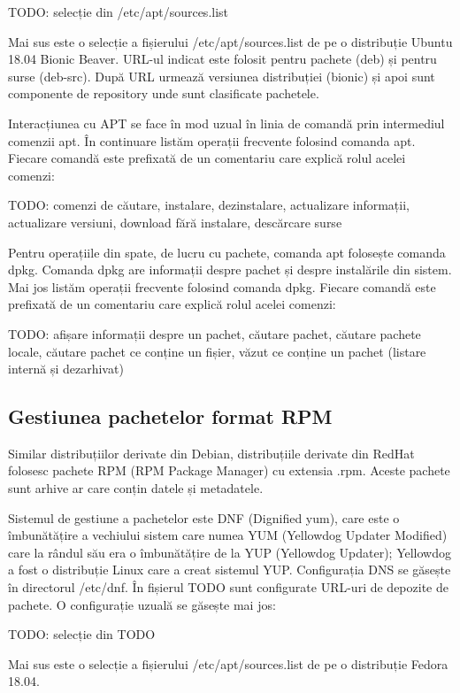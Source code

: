 TODO: selecție din /etc/apt/sources.list

Mai sus este o selecție a fișierului /etc/apt/sources.list de pe o distribuție Ubuntu 18.04 Bionic Beaver. URL-ul indicat este folosit pentru pachete (deb) și pentru surse (deb-src). După URL urmează versiunea distribuției (bionic) și apoi sunt componente de repository unde sunt clasificate pachetele.

Interacțiunea cu APT se face în mod uzual în linia de comandă prin intermediul comenzii apt. În continuare listăm operații frecvente folosind comanda apt. Fiecare comandă este prefixată de un comentariu care explică rolul acelei comenzi:

TODO: comenzi de căutare, instalare, dezinstalare, actualizare informații, actualizare versiuni, download fără instalare, descărcare surse

Pentru operațiile din spate, de lucru cu pachete, comanda apt folosește comanda dpkg. Comanda dpkg are informații despre pachet și despre instalările din sistem. Mai jos listăm operații frecvente folosind comanda dpkg. Fiecare comandă este prefixată de un comentariu care explică rolul acelei comenzi:

TODO: afișare informații despre un pachet, căutare pachet, căutare pachete locale, căutare pachet ce conține un fișier, văzut ce conține un pachet (listare internă și dezarhivat)

\subsection{Gestiunea pachetelor format RPM}
\label{sec:package:rpm}

Similar distribuțiilor derivate din Debian, distribuțiile derivate din RedHat folosesc pachete RPM (RPM Package Manager) cu extensia .rpm.
 Aceste pachete sunt arhive ar care conțin datele și metadatele.

Sistemul de gestiune a pachetelor este DNF (Dignified yum), care este o îmbunătățire a vechiului sistem care numea YUM (Yellowdog Updater Modified) care la rândul său era o îmbunătățire de la YUP (Yellowdog Updater); Yellowdog a fost o distribuție Linux care a creat sistemul YUP. Configurația DNS se găsește în directorul /etc/dnf. În fișierul TODO sunt configurate URL-uri de depozite de pachete. O configurație uzuală se găsește mai jos:

TODO: selecție din TODO

Mai sus este o selecție a fișierului /etc/apt/sources.list de pe o distribuție Fedora 18.04.

